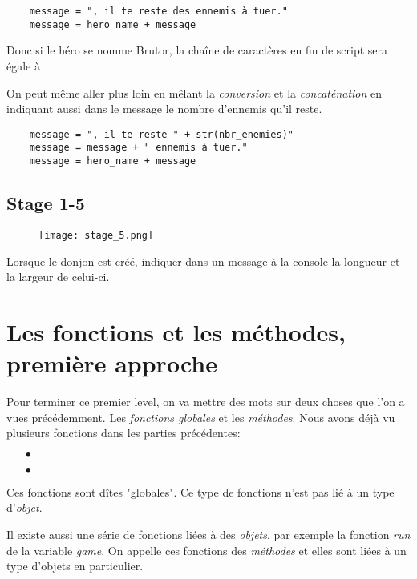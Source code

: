 \begin{lstlisting}
	message = ", il te reste des ennemis à tuer."
	message = hero_name + message
\end{lstlisting}

Donc si le héro se nomme Brutor, la chaîne de caractères en fin de script sera égale à 

On peut même aller plus loin en mêlant la \emph{conversion} et la \emph{concaténation} en indiquant aussi dans le message le nombre d'ennemis qu'il reste.

\begin{lstlisting}
	message = ", il te reste " + str(nbr_enemies)"
	message = message + " ennemis à tuer."
	message = hero_name + message
\end{lstlisting}

\subsection{Stage 1-5}
\begin{figure}[ht]
\texttt{[image: stage\_5.png]} 
\end{figure}

Lorsque le donjon est créé, indiquer dans un message à la console la longueur et la largeur de celui-ci.

\section{Les fonctions et les méthodes, première approche}

Pour terminer ce premier level, on va mettre des mots sur deux choses que l'on a vues précédemment. Les \emph{fonctions globales} et les \emph{méthodes}.
Nous avons déjà vu plusieurs fonctions dans les parties précédentes:
\begin{itemize}
	\item[$\bullet$] 
	\item[$\bullet$] 
\end{itemize}

Ces fonctions sont dîtes "globales". Ce type de fonctions n'est pas lié à un type d'\emph{objet}.

Il existe aussi une série de fonctions liées à des \emph{objets}, par exemple la fonction \emph{run} de la variable \emph{game}.
On appelle ces fonctions des \emph{méthodes} et elles sont liées à un type d'objets en particulier.

